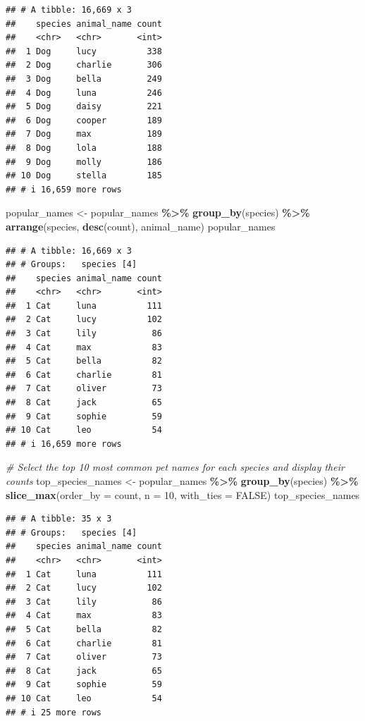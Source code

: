 \documentclass[
]{article}
\newenvironment{Shaded}{\begin{snugshade}}{\end{snugshade}}
\newcommand{\AttributeTok}[1]{\textcolor[rgb]{0.13,0.29,0.53}{#1}}
\newcommand{\CommentTok}[1]{\textcolor[rgb]{0.56,0.35,0.01}{\textit{#1}}}
\newcommand{\ConstantTok}[1]{\textcolor[rgb]{0.56,0.35,0.01}{#1}}
\newcommand{\DecValTok}[1]{\textcolor[rgb]{0.00,0.00,0.81}{#1}}
\newcommand{\FunctionTok}[1]{\textcolor[rgb]{0.13,0.29,0.53}{\textbf{#1}}}
\newcommand{\NormalTok}[1]{#1}
\newcommand{\OtherTok}[1]{\textcolor[rgb]{0.56,0.35,0.01}{#1}}
\newcommand{\SpecialCharTok}[1]{\textcolor[rgb]{0.81,0.36,0.00}{\textbf{#1}}}
\begin{document}
\begin{verbatim}
## # A tibble: 16,669 x 3
##    species animal_name count
##    <chr>   <chr>       <int>
##  1 Dog     lucy          338
##  2 Dog     charlie       306
##  3 Dog     bella         249
##  4 Dog     luna          246
##  5 Dog     daisy         221
##  6 Dog     cooper        189
##  7 Dog     max           189
##  8 Dog     lola          188
##  9 Dog     molly         186
## 10 Dog     stella        185
## # i 16,659 more rows
\end{verbatim}

\begin{Shaded}
\begin{Highlighting}[]
\NormalTok{popular\_names }\OtherTok{\textless{}{-}}\NormalTok{ popular\_names }\SpecialCharTok{\%\textgreater{}\%}
  \FunctionTok{group\_by}\NormalTok{(species) }\SpecialCharTok{\%\textgreater{}\%}
  \FunctionTok{arrange}\NormalTok{(species, }\FunctionTok{desc}\NormalTok{(count), animal\_name)}
\NormalTok{popular\_names}
\end{Highlighting}
\end{Shaded}

\begin{verbatim}
## # A tibble: 16,669 x 3
## # Groups:   species [4]
##    species animal_name count
##    <chr>   <chr>       <int>
##  1 Cat     luna          111
##  2 Cat     lucy          102
##  3 Cat     lily           86
##  4 Cat     max            83
##  5 Cat     bella          82
##  6 Cat     charlie        81
##  7 Cat     oliver         73
##  8 Cat     jack           65
##  9 Cat     sophie         59
## 10 Cat     leo            54
## # i 16,659 more rows
\end{verbatim}

\begin{Shaded}
\begin{Highlighting}[]
\CommentTok{\# Select the top 10 most common pet names for each species and display their counts}
\NormalTok{top\_species\_names }\OtherTok{\textless{}{-}}\NormalTok{ popular\_names }\SpecialCharTok{\%\textgreater{}\%}
  \FunctionTok{group\_by}\NormalTok{(species) }\SpecialCharTok{\%\textgreater{}\%}
  \FunctionTok{slice\_max}\NormalTok{(}\AttributeTok{order\_by =}\NormalTok{ count, }\AttributeTok{n =} \DecValTok{10}\NormalTok{, }\AttributeTok{with\_ties =} \ConstantTok{FALSE}\NormalTok{)}
\NormalTok{top\_species\_names}
\end{Highlighting}
\end{Shaded}

\begin{verbatim}
## # A tibble: 35 x 3
## # Groups:   species [4]
##    species animal_name count
##    <chr>   <chr>       <int>
##  1 Cat     luna          111
##  2 Cat     lucy          102
##  3 Cat     lily           86
##  4 Cat     max            83
##  5 Cat     bella          82
##  6 Cat     charlie        81
##  7 Cat     oliver         73
##  8 Cat     jack           65
##  9 Cat     sophie         59
## 10 Cat     leo            54
## # i 25 more rows
\end{verbatim}
\end{document}
